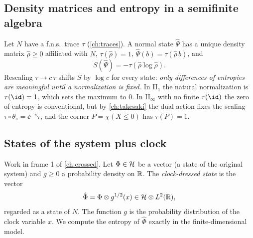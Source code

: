 \subsection{Density matrices and entropy in a semifinite algebra}

Let $N$ have a f.n.s.\ trace $\tau$ (\cref{ch:traces}). A normal state $\hat\Psi$ has a unique density matrix $\hat\rho\ge0$ affiliated with $N$, $\tau(\hat\rho)=1$, $\hat\Psi(b)=\tau(\hat\rho\,b)$, and
\begin{equation}
S(\hat\Psi)=-\tau(\hat\rho\log\hat\rho).
\end{equation}
Rescaling $\tau\to c\,\tau$ shifts $S$ by $\log c$ for every state: \emph{only differences of entropies are meaningful until a normalization is fixed.} In II$_1$ the natural normalization is $\tau(\id)=1$, which sets the maximum to $0$. In II$_\infty$ with no finite $\tau(\id)$ the zero of entropy is conventional, but by \cref{ch:takesaki} the dual action fixes the scaling $\tau\circ\theta_s=\ee^{-s}\tau$, and the corner $P=\chi(X\le0)$ has $\tau(P)=1$.

\subsection{States of the system plus clock}

Work in frame 1 of \cref{ch:crossed}. Let $\Phi\in\mathcal{H}$ be a vector (a state of the original system) and $g\ge0$ a probability density on $\mathbb{R}$. The \emph{clock-dressed state} is the vector
\begin{equation}
\hat\Phi=\Phi\otimes g^{1/2}(x)\in\mathcal{H}\otimes L^2(\mathbb{R}),
\end{equation}
regarded as a state of $N$. The function $g$ is the probability distribution of the clock variable $x$. We compute the entropy of $\hat\Phi$ exactly in the finite-dimensional model.

